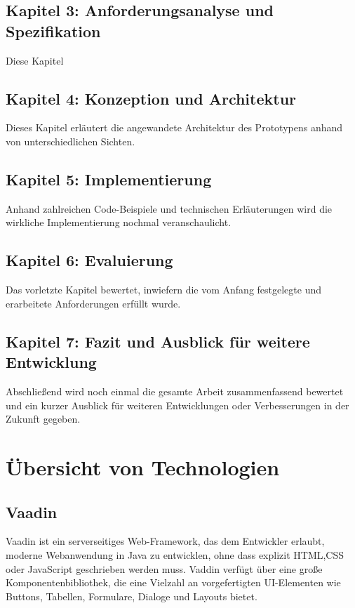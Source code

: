 \documentclass[a4paper,12pt]{scrreprt}
\begin{document}
\section*{\small \textbf{Kapitel 3: Anforderungsanalyse und Spezifikation}}
Diese Kapitel 
\section*{\small \textbf{Kapitel 4: Konzeption und Architektur}}
Dieses Kapitel erläutert die angewandete Architektur des Prototypens anhand von unterschiedlichen Sichten.
\section*{\small \textbf{Kapitel 5: Implementierung}}
Anhand zahlreichen Code-Beispiele und technischen Erläuterungen wird die wirkliche Implementierung nochmal veranschaulicht. 
\section*{\small \textbf{Kapitel 6: Evaluierung}}
Das vorletzte Kapitel bewertet, inwiefern die vom Anfang festgelegte und erarbeitete Anforderungen erfüllt wurde. 
\section*{\small \textbf{Kapitel 7: Fazit und Ausblick für weitere Entwicklung}}
Abschließend wird noch einmal die gesamte Arbeit zusammenfassend bewertet und ein kurzer Ausblick für weiteren Entwicklungen oder Verbesserungen in der Zukunft gegeben.

\chapter{Übersicht von Technologien}
\section{Vaadin}
Vaadin ist ein serverseitiges Web-Framework, das dem Entwickler erlaubt, moderne Webanwendung in Java zu entwicklen, ohne dass explizit HTML,CSS oder JavaScript geschrieben werden muss. Vaddin verfügt über eine große Komponentenbibliothek, die eine Vielzahl an vorgefertigten UI-Elementen wie Buttons, Tabellen, Formulare, Dialoge und Layouts bietet.
\end{document}
